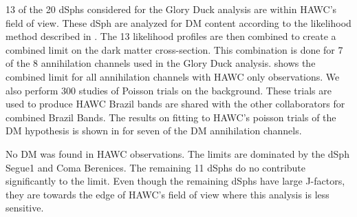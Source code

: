 13 of the 20 dSphs considered for the Glory Duck analysis are within HAWC's field of view.
These dSph are analyzed for DM content according to the likelihood method described in .
The 13 likelihood profiles are then combined to create a combined limit on the dark matter cross-section.
This combination is done for 7 of the 8 annihilation channels used in the Glory Duck analysis.
 shows the combined limit for all annihilation channels with HAWC only observations.
We also perform 300 studies of Poisson trials on the background.
These trials are used to produce HAWC Brazil bands are shared with the other collaborators for combined Brazil Bands.
The results on fitting to HAWC's poisson trials of the DM hypothesis is shown in  for seven of the DM annihilation channels.

No DM was found in HAWC observations.
The limits are dominated by the dSph Segue1 and Coma Berenices.
The remaining 11 dSphs do no contribute significantly to the limit.
Even though the remaining dSphs have large J-factors, they are towards the edge of HAWC's field of view where this analysis is less sensitive.

